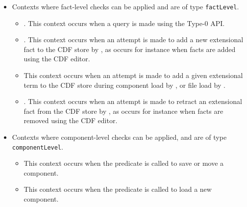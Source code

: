 \begin{itemize}
\item Contexts where fact-level checks can be applied and are of type
{\tt factLevel}.
\begin{itemize}
\item {}.  This context occurs when a query is made using the
Type-0 API.

\item {}.  This context occurs when an attempt is
made to add a new extensional fact to the CDF store by
, as occurs for instance when facts are added using
the CDF editor.  

\item {} This context occurs when an attempt is
made to add a given extensional term to the CDF store during component
load by , or file load by
.

\item {}.  This context occurs when an attempt
is made to retract an extensional fact from the CDF store by
, as occurs for instance when facts are removed using
the CDF editor.



\end{itemize}

\item Contexts where component-level checks can be applied, and are of
type {\tt componentLevel}.
\begin{itemize}
\item {} This context occurs when the
predicate  is called to save or move a
component.

\item {} This context occurs  when the predicate
 is called to load a new component.
\end{itemize}
\end{itemize}


